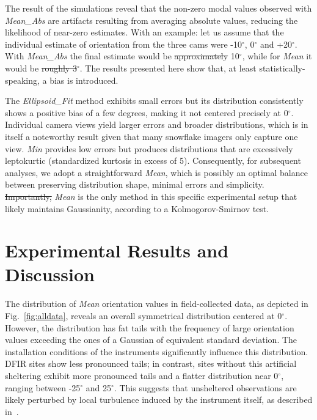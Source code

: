\documentclass[draft]{agujournal2019}
\providecommand{\DIFadd}[1]{{\protect\color{blue}\uwave{#1}}} %
\providecommand{\DIFdel}[1]{{\protect\color{red}\sout{#1}}}                      %
\providecommand{\DIFaddbegin}{} %
\providecommand{\DIFaddend}{} %
\providecommand{\DIFdelbegin}{} %
\providecommand{\DIFdelend}{} %
\begin{document}
The result of the simulations reveal that the non-zero modal values observed with \textit{Mean\_Abs} are artifacts resulting from averaging absolute values, reducing the likelihood of near-zero estimates. With an example: let us assume that the individual estimate of orientation from the three cams were -10$^\circ$, 0$^\circ$ and +20$^\circ$. With \textit{Mean\_Abs} the final estimate would be \DIFdelbegin \DIFdel{approximately }\DIFdelend 10$^\circ$, while for \textit{Mean} it would be \DIFdelbegin \DIFdel{roughly 3}\DIFdelend \DIFaddbegin \DIFadd{3.33}\DIFaddend $^\circ$. The results presented here show that, at least statistically-speaking, a bias is introduced. 

The \textit{Ellipsoid\_Fit} method exhibits small errors but its distribution consistently shows a positive bias of a few degrees, making it not centered precisely at 0$^\circ$. Individual camera views yield larger errors and broader distributions, which is in itself a noteworthy result given that many snowflake imagers only capture one view. \textit{Min} provides low errors but produces distributions that are excessively leptokurtic (standardized kurtosis in excess of 5). Consequently, for subsequent analyses, we adopt a straightforward \textit{Mean}, which is possibly an optimal balance between preserving distribution shape, minimal errors and simplicity. \DIFdelbegin \DIFdel{Importantly, }\DIFdelend \textit{Mean} is the only method in this specific experimental setup that likely maintains Gaussianity,  according to a Kolmogorov-Smirnov test.


\section{Experimental Results and Discussion}
The distribution of \textit{Mean} orientation values in field-collected data, as depicted in Fig.~\ref{fig:alldata}, reveals an overall symmetrical distribution centered at 0$^\circ$. However, the distribution has fat tails with the frequency of large orientation values exceeding the ones of a Gaussian of equivalent standard deviation. The installation conditions of the instruments significantly influence this distribution. DFIR sites show less pronounced tails; in contrast, sites without this artificial sheltering exhibit more pronounced tails and a flatter distribution near 0$^\circ$, ranging between -25$^\circ$ and 25$^\circ$. This suggests that unsheltered observations are likely perturbed by local turbulence induced by the instrument itself, as described in~.
\end{document}
